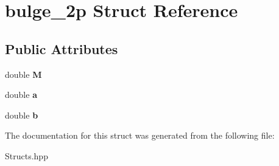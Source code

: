 \hypertarget{structbulge__2p}{}\section{bulge\+\_\+2p Struct Reference}
\label{structbulge__2p}
\subsection*{Public Attributes}
\begin{DoxyCompactItemize}
\item 
\mbox{\label{structbulge__2p_a9aa359566f33482bdc1b80a725ad7003}} 
double {\bfseries M}
\item 
\mbox{\label{structbulge__2p_acea943134cdc4383146793ff1c50d487}} 
double {\bfseries a}
\item 
\mbox{\label{structbulge__2p_a61c806dbdb1232f50854d4b240cb4322}} 
double {\bfseries b}
\end{DoxyCompactItemize}


The documentation for this struct was generated from the following file\+:\begin{DoxyCompactItemize}
\item 
Structs.\+hpp\end{DoxyCompactItemize}

